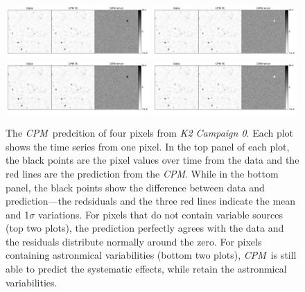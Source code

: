 \documentclass[12pt, preprint]{aastex}
\newcommand{\project}[1]{\textsl{#1}}
\newcommand{\cpm}{\project{CPM}}
\newcommand{\KTCZ}{\project{K2 Campaign 0}}
\begin{document}
\begin{figure}[p]
\begin{center}
\includegraphics[width=0.49\textwidth]{f1a}
\includegraphics[width=0.49\textwidth]{f1b}
\includegraphics[width=0.49\textwidth]{f1c}
\includegraphics[width=0.49\textwidth]{f1d}
\end{center}
\caption{
  \label{lightcurves}
   The \cpm\ predcition of four pixels from \KTCZ. 
  Each plot shows the time series from one pixel.
  In the top panel of each plot, the black points are the pixel values over time from the data and the red lines are the prediction from the \cpm. 
  While in the bottom panel, the black points show the difference between data and prediction---the redsiduals and the three red lines indicate the mean and 1$\sigma$ variations.
  For pixels that do not contain variable sources (top two plots), the prediction perfectly agrees with the data and the residuals distribute normally around the zero. For pixels containing astronmical variabilities (bottom two plots), \cpm\ is still able to predict the systematic effects, while retain the astronmical variabilities.
}
\end{figure}
\end{document}
